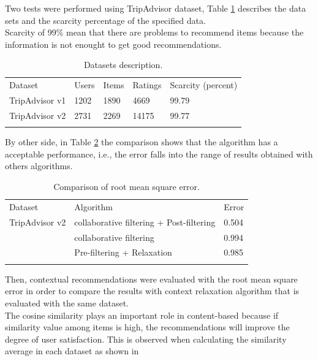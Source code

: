 Two tests were performed using TripAdvisor dataset, 
Table  \ref{tab:3} describes the data sets and the scarcity percentage of the
specified data. \\ Scarcity of 99\% mean that there are problems to
recommend items because the information is not enought to get 
good recommendations.
\begin{table}
\centering
\small
\captionsetup{font=footnotesize}
\caption{Datasets description.}
\label{tab:3}      
\begin{tabular}{lllll}
\hline\noalign{\smallskip}
Dataset & Users & Items & Ratings & Scarcity (percent) \\
\noalign{\smallskip}\hline\noalign{\smallskip}
TripAdvisor v1 & 1202 & 1890 & 4669 & 99.79 \\
TripAdvisor v2 & 2731 & 2269 & 14175 & 99.77 \\
\noalign{\smallskip}\hline
\end{tabular}
\end{table}
By other side, in Table  \ref{tab:4} the comparison
shows that the algorithm has a acceptable performance, i.e., the error
falls into the range of results obtained with others algorithms. 
\begin{table}
\centering
\small
\captionsetup{font=footnotesize}
\caption{Comparison of root mean square error.}
\label{tab:4}  
\small   
\begin{tabular}{lll}
\hline\noalign{\smallskip}
Dataset & Algorithm & Error \\
\noalign{\smallskip}\hline\noalign{\smallskip}
TripAdvisor v2 & collaborative filtering + Post-filtering  & 0.504  \\
                        & collaborative filtering                           & 0.994  \\
                        & Pre-filtering + Relaxation                     & 0.985  \\
\noalign{\smallskip}\hline
\end{tabular}
\end{table}
Then, contextual recommendations were evaluated with the 
root mean square error in order to compare the results with context 
relaxation algorithm  \cite{zheng2012differential} that is evaluated 
with the same dataset.\\ 
The cosine similarity plays an important role in content-based because
if similarity value among items is high, the recommendations will
improve the degree of user satisfaction. This is observed when
calculating the similarity average in each dataset as shown in 
